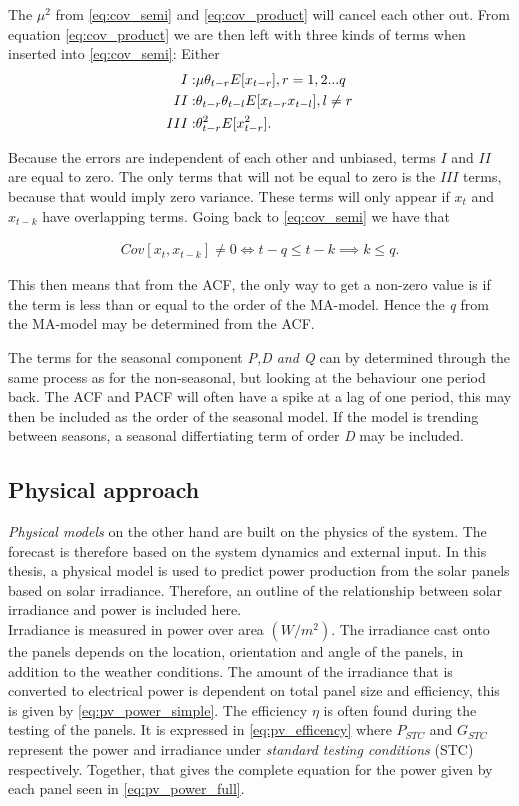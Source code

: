 The $\mu^2$ from \ref{eq:cov_semi} and \ref{eq:cov_product} will cancel each other out. From equation \ref{eq:cov_product} we are then left with three kinds of terms when inserted into \ref{eq:cov_semi}: Either 
\begin{align}
    I: & \mu \theta_{t-r}E[x_{t-r}], r=1,2...q\notag\\
    II:& \theta_{t-r}\theta_{t-l}E[x_{t-r}x_{t-l}], l\neq r\notag\\
    III:& \theta_{t-r}^2E[x_{t-r}^2].
\end{align}

Because the errors are independent of each other and unbiased, terms $I$ and $II$ are equal to zero. The only terms that will not be equal to zero is the $III$ terms, because that would imply zero variance. These terms will only appear if $x_t$ and $x_{t-k}$ have overlapping terms. Going back to \ref{eq:cov_semi} we have that

\begin{align}
    Cov[x_t,x_{t-k}] \neq 0 \iff t-q\leq t-k \implies k\leq q.
\end{align}

This then means that from the ACF, the only way to get a non-zero value is if the term is less than or equal to the order of the MA-model. Hence the \textit{q} from the MA-model may be determined from the ACF.

The terms for the seasonal component \textit{P,D and Q} can by determined through the same process as for the non-seasonal, but looking at the behaviour one period back. The ACF and PACF will often have a spike at a lag of one period, this may then be included as the order of the seasonal model. If the model is trending between seasons, a seasonal differtiating term of order \textit{D} may be included.


\subsection{Physical approach}\label{seq:physical_forecasting}
\textit{Physical models} on the other hand are built on the physics of the system. The forecast is therefore based on the system dynamics and external input. In this thesis, a physical model is used to predict power production from the solar panels based on solar irradiance. Therefore, an outline of the relationship between solar irradiance and power is included here.\\

Irradiance is measured in power over area $(W/m^2)$. The irradiance cast onto the panels depends on the location, orientation and angle of the panels, in addition to the weather conditions. The amount of the irradiance that is converted to electrical power is dependent on total panel size and efficiency, this is given by \ref{eq:pv_power_simple}. The efficiency $\eta$ is often found during the testing of the panels. It is expressed in \ref{eq:pv_efficency} where $P_{STC}$ and $G_{STC}$ represent the power and irradiance under \textit{standard testing conditions} (STC) respectively. Together, that gives the complete equation for the power given by each panel seen in \ref{eq:pv_power_full}. 

